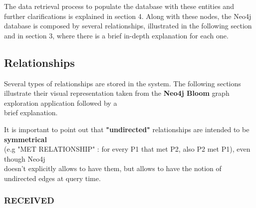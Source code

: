 \documentclass{article}[IEEEtran]
\begin{document}
The data retrieval process to populate the database with these entities and further clarifications is explained in section 4. Along with these nodes, the Neo4j database is composed by several relationships, illustrated in the following section and in section 3, where there is a brief in-depth explanation for each one.


\newpage
\subsection{Relationships}

Several types of relationships are stored in the system. The following sections illustrate their visual representation taken from the \textbf{Neo4j Bloom} \cite{neo4jbloom} graph exploration application followed by a \\ brief explanation.

It is important to point out that \textbf{"undirected"} relationships are intended to be \textbf{symmetrical} \\ (e.g "MET RELATIONSHIP" : for every P1 that met P2, also P2 met P1), even though Neo4j \\ doesn't explicitly allows to have them, but allows to have the notion of undirected edges at query time\cite{neo4jundirected}.

\vspace{0.5cm}


\subsubsection{RECEIVED}
\end{document}
